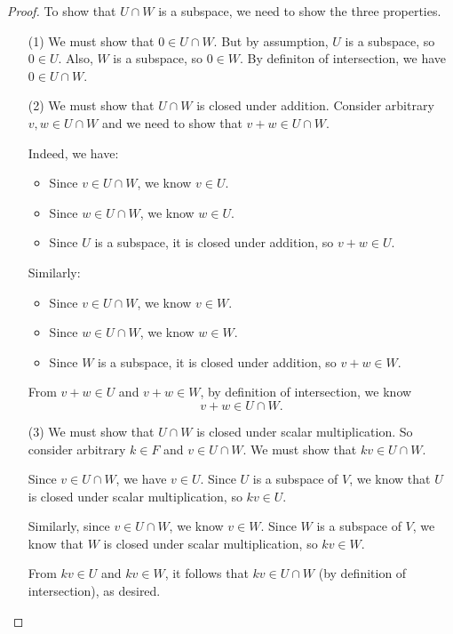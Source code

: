 \documentclass[11pt]{article}
\begin{document}
    \begin{proof}
        To show that \(U \cap W\) is a subspace, we need to show the three properties.
        \begin{enumerate}
            \item[(1)] We must show that \(0 \in U \cap W\). But by assumption, $U$ is a subspace, so \(0 \in U\). Also, $W$ is a subspace, so \(0 \in W\). By definiton of intersection, we have \(0 \in U \cap W\).
            \item[(2)] We must show that \(U \cap W\) is closed under addition. Consider arbitrary \(v,w \in U \cap W\) and we need to show that \(v + w \in U \cap W\).
            
            Indeed, we have:
            \begin{itemize}
                \item Since \(v \in U \cap W\), we know \(v \in U\).
                \item Since \(w \in U \cap W\), we know \(w \in U\).
                \item Since $U$ is a subspace, it is closed under addition, so \(v + w \in U\).
            \end{itemize}

            Similarly:
            \begin{itemize}
                \item Since \(v \in U \cap W\), we know \(v \in W\).
                \item Since \(w \in U \cap W\), we know \(w \in W\).
                \item Since $W$ is a subspace, it is closed under addition, so \(v + w \in W\).
            \end{itemize}

            From \(v + w \in U\) and \(v + w \in W\), by definition of intersection, we know \[v + w \in U \cap W.\]

            \item[(3)] We must show that \(U \cap W\) is closed under scalar multiplication. So consider arbitrary \(k \in F\) and \(v \in U \cap W\). We must show that \(kv \in U \cap W.\)
            
            Since \(v \in U \cap W\), we have \(v \in U\). Since $U$ is a subspace of $V$, we know that $U$ is closed under scalar multiplication, so $kv \in U$.

            Similarly, since \(v \in U \cap W\), we know \(v \in W.\) Since $W$ is a subspace of $V$, we know that $W$ is closed under scalar multiplication, so $kv \in W$.

            From \(kv \in U\) and \(kv \in W\), it follows that \(kv \in U \cap W\) (by definition of intersection), as desired.
        \end{enumerate}
    \end{proof}
\end{document}
